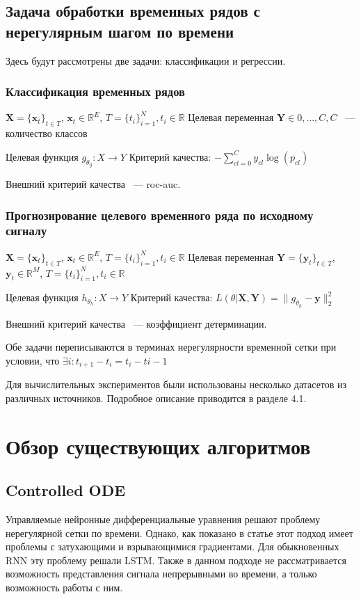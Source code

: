 \documentclass[12pt]{article}
\newcommand{\x}{\mathbf{x}}
\newcommand{\y}{\mathbf{y}}
\newcommand{\Y}{\mathbf{Y}}
\newcommand{\X}{\mathbf{X}}
\newcommand{\R}{\mathbb{R}}
\begin{document}
\subsection{Задача обработки временных рядов с нерегулярным шагом по времени}
Здесь будут рассмотрены две задачи: классификации и регрессии.

\subsubsection{Классификация временных рядов}
$\X = \{\x_t\}_{t\in T}$, $\x_t \in \R^E$, $T = \{t_i\}_{i=1}^{N}, t_i \in \R$
Целевая переменная $\Y \in {0, \dots , C}, C$ ~--- количество классов

Целевая функция $g_{\theta_g}: X \to Y$
Критерий качества: $−\sum\limits_{cl=0}^{C}y_{cl}\log(p_{cl})$

Внешний критерий качества ~--- roc-auc.
\subsubsection{Прогнозирование целевого временного ряда по исходному сигналу}
$\X = \{\x_t\}_{t\in T}$, $\x_t \in \R^E$, $T = \{t_i\}_{i=1}^{N}, t_i \in \R$
Целевая переменная $\Y = \{\y_t\}_{t\in T}$, $\y_t \in \R^M$, $T = \{t_i\}_{i=1}^{N}, t_i \in \R$

Целевая функция $h_{\theta_h}: X \to Y$
Критерий качества: $L(\theta|\X, \Y) = \|g_{\theta_h} - \y\|^2_2$

Внешний критерий качества ~--- коэффициент детерминации.


Обе задачи переписываются в терминах нерегулярности временной сетки при условии, что $\exists i:  t_{i+1} - t_{i} = t_{i} - t{i-1}$









Для вычислительных экспериментов были использованы несколько датасетов из различных источников. Подробное описание приводится в разделе 4.1.


\newpage
\section{Обзор существующих алгоритмов }
\subsection{Controlled ODE}
Управляемые нейронные дифференциальные уравнения решают проблему нерегулярной сетки по времени. Однако, как показано в статье \cite{ode-lstm} этот подход имеет проблемы с затухающими и взрывающимися градиентами. Для обыкновенных RNN эту проблему решали LSTM. Также в данном подходе не рассматривается возможность представления сигнала непрерывными во времени, а только возможность работы с ним.
\end{document}
